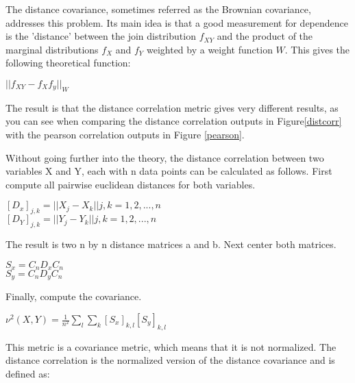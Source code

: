 
The distance covariance, sometimes referred as the Brownian covariance, addresses this problem\citep{distPaper}. Its main idea is that a good measurement for dependence is the 'distance' between the join distribution $f_{XY}$ and the product of the marginal distributions $f_X$ and $f_Y$ weighted by a weight function $W$. This gives the following theoretical function:

\begin{center}
$|| f_{XY} - f_Xf_y||_W$
\end{center}

The result is that the distance correlation metric gives very different results, as you can see when comparing the distance correlation outputs in Figure\ref{distcorr} with the pearson correlation outputs in Figure \ref{pearson}.


Without going further into the theory, the distance correlation between two variables X and Y, each with n data points can be calculated as follows.
First compute all pairwise euclidean distances for both variables.
\begin{center}
$[D_x]_{j,k} = || X_j - X_k||   j,k = 1,2,...,n$\\
$[D_Y]_{j,k} = || Y_j - Y_k||   j,k = 1,2,...,n$\\
\end{center}
The result is two n by n distance matrices a and b. Next center both matrices.
\begin{center}
$S_x = C_nD_xC_n$\\
$S_y = C_nD_yC_n$\\
\end{center}
Finally, compute the covariance.
\begin{center}
$\nu^2(X,Y) = \frac{1}{n^2} \sum\limits_l \sum\limits_k [S_x]_{k,l}[S_y]_{k,l}$ 
\end{center}

This metric is a covariance metric, which means that it is not normalized. The distance correlation is the normalized version of the distance covariance and is defined as:

